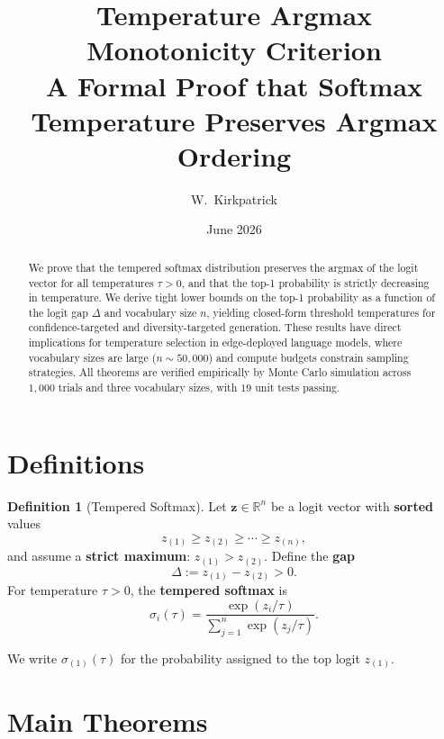 \documentclass[11pt,a4paper]{article}
\title{\textbf{Temperature Argmax Monotonicity Criterion}\\[6pt]
\large A Formal Proof that Softmax Temperature Preserves Argmax Ordering}
\author{W.\ Kirkpatrick}
\date{June 2026}
\theoremstyle{definition}
\newtheorem{definition}[theorem]{Definition}
\newcommand{\R}{\mathbb{R}}
\newcommand{\softmax}{\sigma}
\newcommand{\temp}{\tau}
\newcommand{\gap}{\Delta}
\begin{document}
\maketitle

\begin{abstract}
We prove that the tempered softmax distribution preserves the argmax of the logit vector for all temperatures $\temp > 0$, and that the top-1 probability is strictly decreasing in temperature. We derive tight lower bounds on the top-1 probability as a function of the logit gap $\gap$ and vocabulary size $n$, yielding closed-form threshold temperatures for confidence-targeted and diversity-targeted generation. These results have direct implications for temperature selection in edge-deployed language models, where vocabulary sizes are large ($n \sim 50{,}000$) and compute budgets constrain sampling strategies. All theorems are verified empirically by Monte Carlo simulation across $1{,}000$ trials and three vocabulary sizes, with $19$ unit tests passing.
\end{abstract}

\tableofcontents
\newpage

\section{Definitions}

\begin{definition}[Tempered Softmax]
Let $\mathbf{z} \in \R^{n}$ be a logit vector with \textbf{sorted} values
\[
  z_{(1)} \geq z_{(2)} \geq \cdots \geq z_{(n)},
\]
and assume a \textbf{strict maximum}: $z_{(1)} > z_{(2)}$. Define the \textbf{gap}
\[
  \gap := z_{(1)} - z_{(2)} > 0.
\]
For temperature $\temp > 0$, the \textbf{tempered softmax} is
\[
  \softmax_i(\temp) = \frac{\exp(z_i / \temp)}{\sum_{j=1}^{n} \exp(z_j / \temp)}.
\]
\end{definition}

We write $\softmax_{(1)}(\temp)$ for the probability assigned to the top logit $z_{(1)}$.

\section{Main Theorems}
\end{document}
